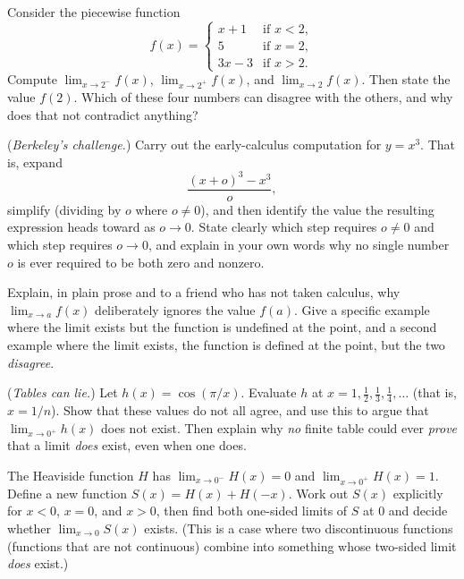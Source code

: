 \begin{exercise}
Consider the piecewise function
\[
  f(x) = \begin{cases} x + 1 & \text{if } x < 2, \\ 5 & \text{if } x = 2, \\ 3x - 3 & \text{if } x > 2. \end{cases}
\]
Compute $\lim_{x\to 2^-} f(x)$, $\lim_{x\to 2^+} f(x)$, and $\lim_{x\to 2} f(x)$. Then state the
value $f(2)$. Which of these four numbers can disagree with the others, and why does that not
contradict anything?
\end{exercise}

\begin{exercise}
(\emph{Berkeley's challenge.}) Carry out the early-calculus computation for
$y = x^3$. That is, expand
\[
  \frac{(x+o)^3 - x^3}{o},
\]
simplify (dividing by $o$ where $o\neq 0$),
and then identify the value the resulting expression heads toward as $o\to 0$. State clearly which
step requires $o\neq 0$ and which step requires $o\to 0$, and explain in your own words why no
single number $o$ is ever required to be both zero and nonzero.
\end{exercise}

\begin{exercise}
Explain, in plain prose and to a friend who has not taken calculus, why
$\lim_{x\to a} f(x)$ deliberately ignores the value $f(a)$. Give a specific example
where the limit exists but the function is undefined at the point, and a second example where the
limit exists, the function is defined at the point, but the two \emph{disagree}.
\end{exercise}

\begin{exercise}
(\emph{Tables can lie.}) Let $h(x) = \cos(\pi/x)$. Evaluate $h$ at $x = 1, \tfrac{1}{2},
\tfrac{1}{3}, \tfrac{1}{4}, \dots$ (that is, $x = 1/n$). Show that these values do not all agree,
and use this to argue that $\lim_{x\to 0^+} h(x)$ does not exist. Then explain why \emph{no}
finite table could ever \emph{prove} that a limit \emph{does} exist, even when one does.
\end{exercise}

\begin{exercise}
The Heaviside function $H$ has $\lim_{x\to 0^-}H(x)=0$ and $\lim_{x\to 0^+}H(x)=1$. Define a new
function $S(x) = H(x) + H(-x)$. Work out $S(x)$ explicitly for $x<0$, $x=0$, and $x>0$, then find
both one-sided limits of $S$ at $0$ and decide whether $\lim_{x\to 0}S(x)$ exists. (This is a
case where two discontinuous functions (functions that are not continuous) combine into
something whose two-sided limit \emph{does} exist.)
\end{exercise}

